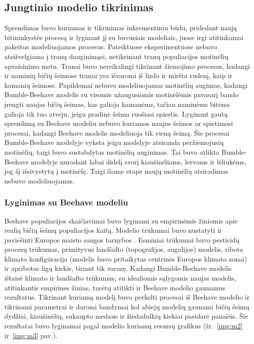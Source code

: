 \documentclass{VUMIFKompMagistrinis}
\begin{document}
\subsection{Jungtinio modelio tikrinimas}
Sprendimas buvo kuriamas ir tikrinimas inkrementiniu būdu, pridedant naują bitininkystės procesą ir lyginant jį su buvusiais modeliais, juose irgi atitinkamai pakeitus modeliuojamos procesus.
Pateiktuose eksperimentuose nebuvo atsižvelgiama į tranų dauginimąsi, netikrinant tranų populiacijos motinėlių apvaisinimo metu. Tranai buvo nereikalingi tikrinant žiemojimo procesus, kadangi ir naminių bičių šeimose tranai yra išvaromi iš lizdo ir miršta rudenį, kaip ir kamanių šeimose. Papildomai nebuvo modeliuojamas motinėlių augimas, kadangi Bumble-Beehave modelis su visomis užaugusiomis motinėlėmis pavasarį bando įrengti naujas bičių šeimas, kas galioja kamanėms, tačiau naminėms bitėms galioja tik tuo atveju, jeigu pradinė šeima ruošiasi spiestis. Lyginant gautą sprendimą su Beehave modeliu nebuvo kuriamos naujos šeimos ar spietimosi procesai, kadangi Beehave modelis modeliuoja tik vieną šeimą. Šie procesai Bumble-Beehave modelyje vyksta jeigu modelyje atsiranda peržiemojusių motinėlių, taigi buvo sustabdytas motinėlių auginimas. Tai buvo atlikta Bumble-Beehave modelyje nurodant labai didelį svorį kiaušinėliams, lervoms ir  lėliukėms, jog šį išsivystytų į motinėlę. Taigi šiame etape naujų motinėlių atsiradimas nebuvo modeliuojamas.


\subsubsection{Lyginimas su Beehave modeliu}
Beehave populiacijos skaičiavimai buvo lyginami su empirinėmis žiniomis apie realią bičių šeimų populiacijos kaitą. Modelio trūkumai buvo nustatyti ir paviešinti Europos maisto saugos tarnybos \cite{EFSA15}. Esminiai trūkumai buvo pesticidų procesų trūkumas, primityvus landšafto (topografijos, augalijos) modelis, ribota klimato konfigūracija (modelis buvo pritaikytas centrinės Europos klimato zonai) ir apribotas ligų kiekis, tiriant tik varozę. Kadangi 	Bumble-Beehave modelis ištaisė klimato ir landšafto trūkumus, su idealiomis sąlygomis naujas modelis, atitinkantis empirines žinias, turėtų atitikti ir Beehave modelio gaunamus rezultatus.
Tikrinant kuriamą modelį buvo perkelti procesai iš Beehave modelio ir tikrinami parametrai ir daromi bandymai kol abiejų modelių gaunami bičių šeimų dydžiai, kiaušinėlių, sukaupto medaus ir žiedadulkių kiekiai pasidarė panašūs. Šie rezultatai buvo lyginamai pagal modelio kuriamų resursų grafikus (žr.~\ref{img:m2} ir~\ref{img:m3} pav.).
\end{document}
